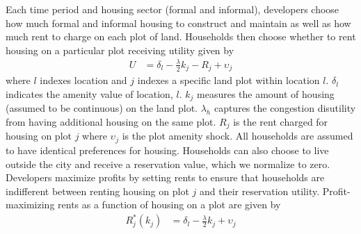 \documentclass[12pt]{article}
\begin{document}

Each time period and housing sector (formal and informal), developers choose how much formal and informal housing to construct and maintain as well as how much rent to charge on each plot of land.  Households then choose whether to rent housing on a particular plot receiving utility given by
\begin{align*}
U &= \delta_{l} - \frac{\lambda}{2} k_{j} - R_{j}   + \upsilon_{j}  
\end{align*}
\noindent where $l$ indexes location and $j$ indexes a specific land plot within location $l$.  $\delta_{l}$ indicates the amenity value of location, $l$.  $k_{j}$ measures the amount of housing (assumed to be continuous) on the land plot.  $\lambda_{h}$ captures the congestion disutility from having additional housing on the same plot.   $R_{j}$ is the rent charged for housing on plot $j$ where $\upsilon_{j}$ is the plot amenity shock.  All households are assumed to have identical preferences for housing.   Households can also choose to live outside the city and receive a reservation value, which we normalize to zero.  Developers maximize profits by setting rents to ensure that households are indifferent between renting housing on plot $j$ and their reservation utility. Profit-maximizing rents as a function of housing on a plot are given by
\begin{align*}
R_{j}^{*}(k_{j}) &= \delta_{l} - \frac{\lambda}{2} k_{j} + \upsilon_{j}
\end{align*}
\end{document}
